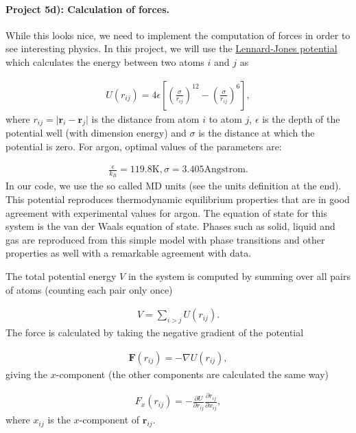 \documentclass[%
oneside,                 %
final,                   %
10pt]{article}
\begin{document}
\paragraph{Project 5d): Calculation of forces.}
While this looks nice, we need to implement the computation of forces in order to see interesting physics. In this project, we will use the \href{{http://en.wikipedia.org/wiki/Lennard-Jones_potential}}{Lennard-Jones potential}  which calculates the energy between two atoms $i$ and $j$ as

\begin{align}
	U(r_{ij}) = 4\epsilon\left[\left(\frac{\sigma}{r_{ij}}\right)^{12} - \left(\frac{\sigma}{r_{ij}}\right)^6\right],
\end{align}
where $r_{ij} = \vert\mathbf{r}_i - \mathbf{r}_j\vert$ is the distance from atom $i$ to atom $j$, $\epsilon$ is the depth of the potential well (with dimension energy) and $\sigma$ is the distance at which the potential is zero. For argon, optimal values of the parameters are:

\begin{align}
	\frac{\epsilon}{k_B} = 119.8\mathrm{K}, \sigma=3.405 \mathrm{Angstrom}.
\end{align}
In our code, we use the so called MD units (see the units definition at the end). This potential reproduces thermodynamic equilibrium properties that are in good agreement with experimental values for argon. The equation of state for this system is the van der Waals equation of state. Phases such as solid, liquid and gas are reproduced from this simple model with phase transitions and other properties as well with a  remarkable agreement with data.

The total potential energy $V$ in the system is computed by summing over all pairs of atoms (counting each pair only once)

\begin{align}
	V = \sum_{i>j} U(r_{ij}).
\end{align}
The force is calculated by taking the negative gradient of the potential

\begin{align}
	\mathbf{F}(r_{ij}) = -\nabla U(r_{ij}),
\end{align}
giving the $x$-component (the other components are calculated the same way)

\begin{align}
	F_x(r_{ij}) = -\frac{\partial U}{\partial r_{ij}}\frac{\partial r_{ij}}{\partial x_{ij}},
\end{align}
where $x_{ij}$ is the $x$-component of $\mathbf{r}_{ij}$.
\end{document}
